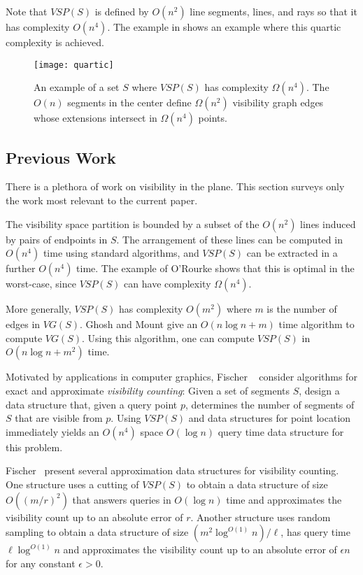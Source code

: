 \documentclass{patmorin}
\newcommand{\VG}{\mathit{VG}}
\newcommand{\VSP}{\mathit{VSP}}
\begin{document}
Note that $\VSP(S)$ is defined by $O(n^2)$ line segments, lines, and rays
so that it has complexity $O(n^4)$.  The example in  shows
an example where this quartic complexity is achieved.

\begin{figure}
  \begin{center}
    \texttt{[image: quartic]}
  \end{center}
  \caption{An example of a set $S$ where $\VSP(S)$ has complexity
$\Omega(n^4)$.  The $O(n)$ segments in the center define $\Omega(n^2)$
visibility graph edges whose extensions intersect in $\Omega(n^4)$ points.}
\end{figure}

\subsection{Previous Work}

There is a plethora of work on visibility in the plane.  This section
surveys only the work most relevant to the current paper.

The visibility space partition is bounded by a subset of the $O(n^2)$ lines
induced by pairs of endpoints in $S$. The arrangement of these lines
can be computed in $O(n^4)$ time using standard algorithms, and $\VSP(S)$
can be extracted in a further $O(n^4)$ time.  The example of O'Rourke shows
that this is optimal in the worst-case, since $\VSP(S)$ can have complexity
$\Omega(n^4)$. 

More generally, $\VSP(S)$ has complexity $O(m^2)$ where $m$ is the number
of edges in $\VG(S)$.  Ghosh and Mount \cite{gmXX} give an $O(n\log n + m)$
time algorithm to compute $\VG(S)$. Using this algorithm, one can compute
$\VSP(S)$ in $O(n\log n + m^2)$ time.

Motivated by applications in computer graphics, Fischer \etal\ \cite{fXX}
consider algorithms for exact and approximate \emph{visibility counting}:
Given a set of segments $S$, design a data structure that, given a query
point $p$, determines the number of segments of $S$ that are visible from
$p$.  Using $\VSP(S)$ and data structures for point location immediately
yields an $O(n^4)$ space $O(\log n)$ query time data structure for this
problem.  

Fischer \etal\ present several approximation data structures for visibility
counting.  One structure uses a cutting \cite{X} of $\VSP(S)$ to obtain a
data structure of size $O((m/r)^2)$ that answers queries in $O(\log n)$
time and approximates the visibility count up to an absolute error of $r$.
Another structure uses random sampling to obtain a data structure of size
$(m^2\log^{O(1)} n)/\ell$, has query time $\ell\log^{O(1)} n$ and approximates
the visibility count up to an absolute error of $\epsilon n$ for any
constant $\epsilon > 0$.
\end{document}
